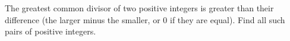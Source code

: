 The greatest common divisor of two positive integers is greater than their difference (the larger minus the smaller, or $0$ if they are equal). Find all such pairs of positive integers.
